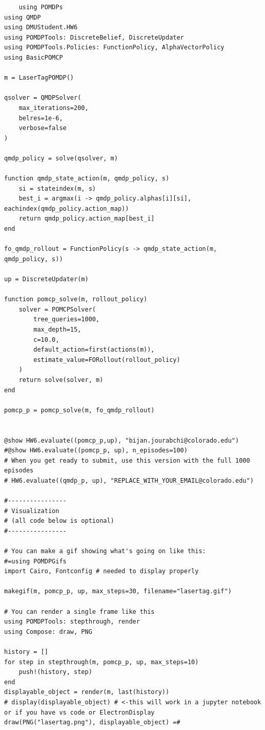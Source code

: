 \documentclass[11pt]{article}
\begin{document}
\begin{lstlisting}
    using POMDPs
using QMDP
using DMUStudent.HW6
using POMDPTools: DiscreteBelief, DiscreteUpdater
using POMDPTools.Policies: FunctionPolicy, AlphaVectorPolicy
using BasicPOMCP

m = LaserTagPOMDP()

qsolver = QMDPSolver(
    max_iterations=200,
    belres=1e-6,
    verbose=false
)

qmdp_policy = solve(qsolver, m)

function qmdp_state_action(m, qmdp_policy, s)
    si = stateindex(m, s)
    best_i = argmax(i -> qmdp_policy.alphas[i][si], eachindex(qmdp_policy.action_map))
    return qmdp_policy.action_map[best_i]
end

fo_qmdp_rollout = FunctionPolicy(s -> qmdp_state_action(m, qmdp_policy, s))

up = DiscreteUpdater(m)

function pomcp_solve(m, rollout_policy)
    solver = POMCPSolver(
        tree_queries=1000,
        max_depth=15,
        c=10.0,
        default_action=first(actions(m)),
        estimate_value=FORollout(rollout_policy)
    )
    return solve(solver, m)
end

pomcp_p = pomcp_solve(m, fo_qmdp_rollout)


@show HW6.evaluate((pomcp_p,up), "bijan.jourabchi@colorado.edu")
#@show HW6.evaluate((pomcp_p, up), n_episodes=100)
# When you get ready to submit, use this version with the full 1000 episodes
# HW6.evaluate((qmdp_p, up), "REPLACE_WITH_YOUR_EMAIL@colorado.edu")

#----------------
# Visualization
# (all code below is optional)
#----------------

# You can make a gif showing what's going on like this:
#=using POMDPGifs
import Cairo, Fontconfig # needed to display properly

makegif(m, pomcp_p, up, max_steps=30, filename="lasertag.gif")

# You can render a single frame like this
using POMDPTools: stepthrough, render
using Compose: draw, PNG

history = []
for step in stepthrough(m, pomcp_p, up, max_steps=10)
    push!(history, step)
end
displayable_object = render(m, last(history))
# display(displayable_object) # <-this will work in a jupyter notebook or if you have vs code or ElectronDisplay
draw(PNG("lasertag.png"), displayable_object) =#

\end{lstlisting}

\end{document}
